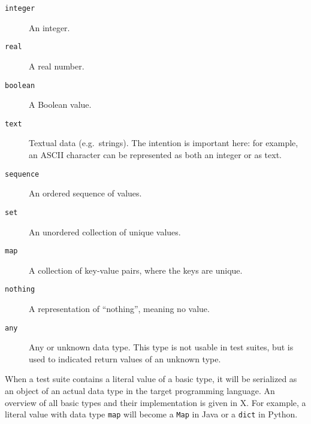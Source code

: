 \documentclass[../main]{subfiles}
\begin{document}
\begin{description}
    \item[\texttt{integer}] An integer.
    \item[\texttt{real}] A real number.
    \item[\texttt{boolean}] A Boolean value.
    \item[\texttt{text}] Textual data (e.g.\ strings). The intention is important here: for example, an \textsc{ASCII} character can be represented as both an integer or as text.
    \item[\texttt{sequence}] An ordered sequence of values.
    \item[\texttt{set}] An unordered collection of unique values.
    \item[\texttt{map}] A collection of key-value pairs, where the keys are unique.
    \item[\texttt{nothing}] A representation of ``nothing'', meaning no value.
    \item[\texttt{any}]  Any or unknown data type. This type is not usable in test suites, but is used to indicated return values of an unknown type.
\end{description}

When a test suite contains a literal value of a basic type, it will be serialized as an object of an actual data type in the target programming language.
An overview of all basic types and their implementation is given in X.
For example, a literal value with data type \texttt{map} will become a \texttt{Map} in Java or a \texttt{dict} in Python.
\end{document}
